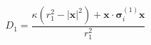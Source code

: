 $$
D_1 = \frac{\kappa \left(r_1^{2} - \lvert\mathbf x\rvert^2\right) + \mathbf x\cdot\boldsymbol\sigma_i^{(1)}\mathbf x}{r_1^{2}}
$$
